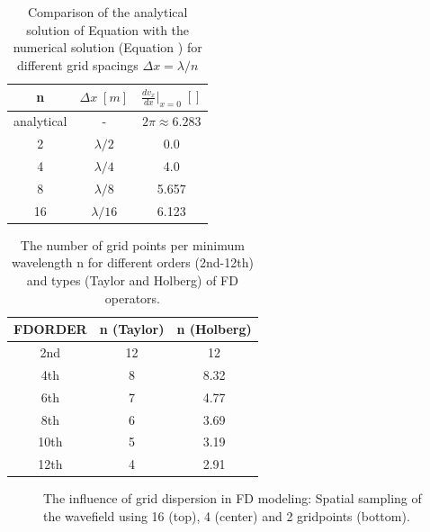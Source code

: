 \documentclass[11pt,onecolumn,oneside]{article}
\begin{document}
\begin{table}[hbt]
\begin{center}
\begin{tabular}{ccc}\hline \hline
n &  $\Delta x\; [m]$ & $\frac{d v_x}{d x}|_{x=0}\; []$ \\ \hline 
analytical & - & $2\pi \approx 6.283$ \\ 
2 & $\lambda/2$ & 0.0 \\ 
4 & $\lambda/4$ & 4.0 \\ 
8 & $\lambda/8$ & 5.657 \\ 
16 & $\lambda/16$ & 6.123 \\ \hline \hline
\end{tabular}
\caption{\label{grid_disp.1} Comparison of the analytical solution of Equation  with the numerical solution (Equation ) for different grid spacings $\Delta x = \lambda /n$}
\end{center}
\end{table}
 
\begin{table}[hbt]
\begin{center}
\begin{tabular}{ccc}\hline \hline
FDORDER & n (Taylor) & n (Holberg) \\ \hline 
2nd   &   12       &  12         \\
4th   &   8        &  8.32       \\
6th   &   7        &  4.77       \\
8th   &   6        &  3.69       \\
10th  &   5        &  3.19       \\
12th  &   4        &  2.91       \\   
\hline \hline
\end{tabular}
\caption{\label{grid_disp.2} The number of grid points per minimum wavelength n for different orders (2nd-12th) and types (Taylor and Holberg) of FD operators.}
\end{center}
\end{table} 



\begin{figure}[ht]
\begin{center}
\caption{\label{grid_disp_pics} The influence of grid dispersion in FD modeling: Spatial sampling of the wavefield using  16 (top), 4 (center) and 2 gridpoints (bottom).}
\end{center}
\end{figure}
\end{document}
